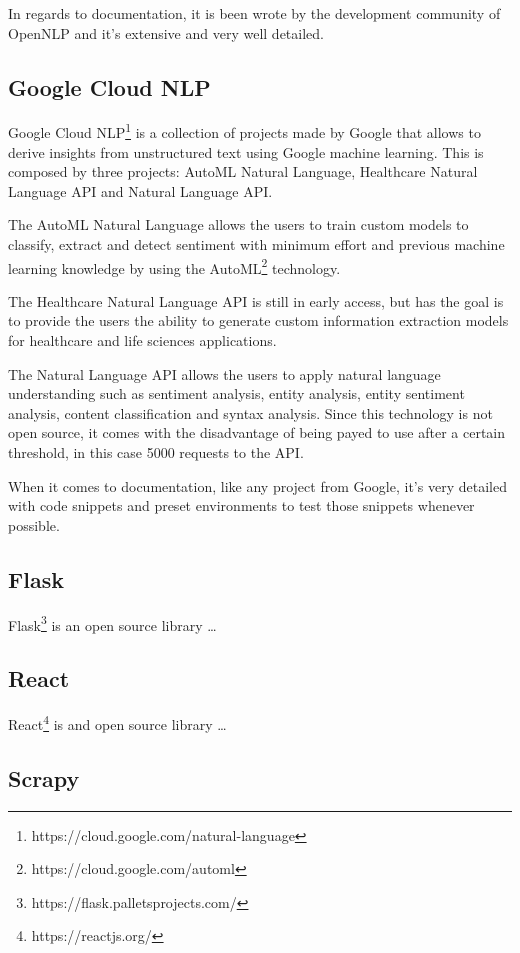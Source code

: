 In regards to documentation, it is been wrote by the development community of OpenNLP and it's extensive and very well detailed.

\subsection{Google Cloud NLP}

Google Cloud NLP\footnote{https://cloud.google.com/natural-language} is a collection of projects made by Google that allows to derive insights from unstructured text using Google machine learning.
This is composed by three projects: AutoML Natural Language, Healthcare Natural Language API and Natural Language API.

The AutoML Natural Language allows the users to train custom models to classify, extract and detect sentiment with minimum effort and previous machine learning knowledge by using the AutoML\footnote{https://cloud.google.com/automl} technology.

The Healthcare Natural Language API is still in early access, but has the goal is to provide the users the ability to generate custom information extraction models for healthcare and life sciences applications.

The Natural Language API allows the users to apply natural language understanding such as sentiment analysis, entity analysis, entity sentiment analysis, content classification and syntax analysis.
Since this technology is not open source, it comes with the disadvantage of being payed to use after a certain threshold, in this case 5000 requests to the API.

When it comes to documentation, like any project from Google, it's very detailed with code snippets and preset environments to test those snippets whenever possible.

\subsection{Flask}

Flask\footnote{https://flask.palletsprojects.com/} is an open source library \dots

\subsection{React}

React\footnote{https://reactjs.org/} is and open source library \dots

\subsection{Scrapy}

